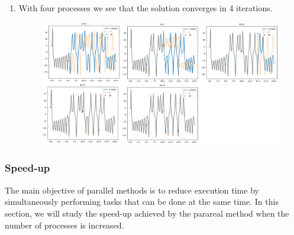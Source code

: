 \begin{enumerate}[label=\textbullet]
\begin{enumerate}[label=-]
		\newpage
		\item With four processes we see that the solution converges in 4 iterations.
		\begin{figure}[H]      
			\qquad \qquad
			\includegraphics[width=0.8\linewidth]{"images/parareal/cpp/lorenz_4p.jpg"}
			\label{lorenz:4}
		\end{figure}
	
	\end{enumerate}

\end{enumerate}

\subsubsection{Speed-up}

The main objective of parallel methods is to reduce execution time by simultaneously performing tasks that can be done at the same time. In this section, we will study the speed-up achieved by the parareal method when the number of processes is increased.

